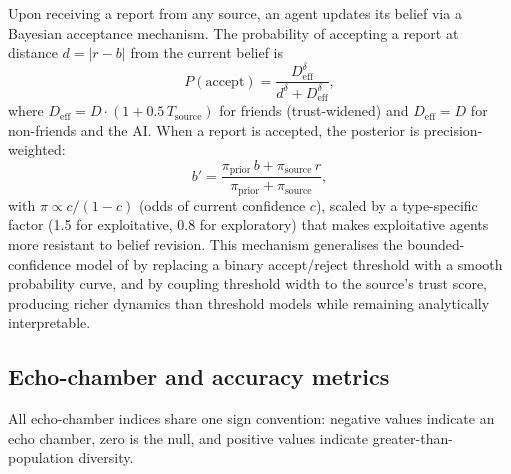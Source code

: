 \documentclass[pdflatex,sn-basic]{sn-jnl}
\begin{document}
Upon receiving a report from any source, an agent updates its belief via a Bayesian acceptance mechanism. The probability of accepting a report at distance $d = |r - b|$ from the current belief is
\begin{equation}
P(\text{accept}) = \frac{D_{\text{eff}}^{\delta}}{d^{\delta} + D_{\text{eff}}^{\delta}},
\label{eq:accept}
\end{equation}
where $D_{\text{eff}} = D \cdot (1 + 0.5\, T_{\text{source}})$ for friends (trust-widened) and $D_{\text{eff}} = D$ for non-friends and the AI. When a report is accepted, the posterior is precision-weighted:
\begin{equation}
b' = \frac{\pi_{\text{prior}}\, b + \pi_{\text{source}}\, r}{\pi_{\text{prior}} + \pi_{\text{source}}},
\label{eq:posterior}
\end{equation}
with $\pi \propto c/(1-c)$ (odds of current confidence $c$), scaled by a type-specific factor (1.5 for exploitative, 0.8 for exploratory) that makes exploitative agents more resistant to belief revision. This mechanism generalises the bounded-confidence model of \citet{deffuant2000mixing} by replacing a binary accept/reject threshold with a smooth probability curve, and by coupling threshold width to the source's trust score, producing richer dynamics than threshold models while remaining analytically interpretable.

\subsection{Echo-chamber and accuracy metrics}\label{sec:metrics}

All echo-chamber indices share one sign convention: negative values indicate an echo chamber, zero is the null, and positive values indicate greater-than-population diversity.
\end{document}
